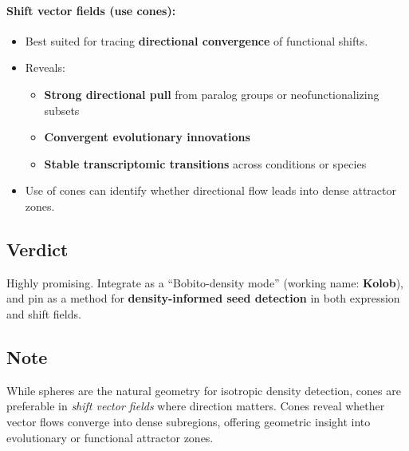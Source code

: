         \paragraph{Shift vector fields (use cones):}
        \begin{itemize}
            \item Best suited for tracing \textbf{directional convergence} of functional shifts.
            \item Reveals:
                  \begin{itemize}
                      \item \textbf{Strong directional pull} from paralog groups or neofunctionalizing subsets
                      \item \textbf{Convergent evolutionary innovations}
                      \item \textbf{Stable transcriptomic transitions} across conditions or species
                  \end{itemize}
            \item Use of cones can identify whether directional flow leads into dense attractor zones.
        \end{itemize}

    \subsection{Verdict}
        Highly promising. Integrate as a ``Bobito-density mode'' (working name: \textbf{Kolob}), and pin as a method for \textbf{density-informed seed detection} in both expression and shift fields.

    \subsection{Note}
        While spheres are the natural geometry for isotropic density detection, cones are preferable in \emph{shift vector fields} where direction matters. Cones reveal whether vector flows converge into dense subregions, offering geometric insight into evolutionary or functional attractor zones.